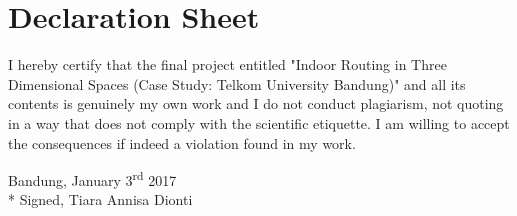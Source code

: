 \chapter*{Declaration Sheet}

	\begin{center}
	\end{center}
	\par I hereby certify that the final project entitled "Indoor Routing in Three Dimensional Spaces (Case Study: Telkom University Bandung)" and all its contents is genuinely my own work and I do not conduct plagiarism, not quoting in a way that does not comply with the scientific etiquette. I am willing to accept the consequences if indeed a violation found in my work.
	\newline
	\newline
	\newline
	
	Bandung, January 3\textsuperscript{rd} 2017
	\\*
	Signed,
	\newline
	\newline
	\newline
	\newline
	\newline
	Tiara Annisa Dionti
